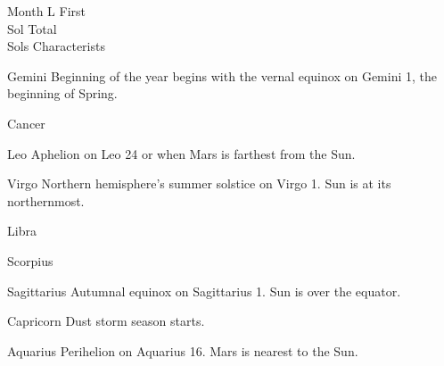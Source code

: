 \vfill
{}
{
    \bTABLE[split=repeat,option=stretch]
    \setupTABLE[column][5]
        [width=.45\textwidth,
        align=yes]
    \setupTABLE[row][each][align=center]
    \setupTABLE[5][1][align=center]

\bTABLEhead
    \bTR[bottomframe=on]
      \bTH  Month \eTH
      \bTH  L \eTH
      \bTH  First\\Sol \eTH
      \bTH  Total\\Sols \eTH
      \bTH  Characterists \eTH
    \eTR
\eTABLEhead

\bTABLEbody
    \bTR
      \bTC Gemini \eTC
      \bTC \math{[0^{\circ}, 30^{\circ})}\eTC
       \eTC
       \eTC
      \bTC Beginning of the year begins with the vernal equinox on Gemini 1, the beginning of Spring.\eTC
    \eTR
    
    \bTR
      \bTC Cancer \eTC
      \bTC \math{[30^{\circ}, 60^{\circ})} \eTC
       \eTC
       \eTC
      \bTC  \eTC
    \eTR
    
    \bTR
      \bTC Leo \eTC
      \bTC \math{[60^{\circ}, 90^{\circ})} \eTC
       \eTC
       \eTC
      \bTC Aphelion on Leo 24 or when Mars is farthest from the Sun.\eTC
    \eTR
    
    \bTR
      \bTC Virgo \eTC
      \bTC \math{[90^{\circ}, 120^{\circ})} \eTC
       \eTC
       \eTC
      \bTC Northern hemisphere's summer solstice on Virgo 1. Sun is at its northernmost.\eTC
    \eTR
    
    \bTR
      \bTC Libra \eTC
      \bTC \math{[120^{\circ}, 150^{\circ})} \eTC
       \eTC
       \eTC
      \bTC  \eTC
    \eTR
    
    \bTR
      \bTC Scorpius \eTC
      \bTC \math{[150^{\circ}, 180^{\circ})} \eTC
       \eTC
       \eTC
      \bTC  \eTC
    \eTR
    
    \bTR
      \bTC Sagittarius \eTC
      \bTC \math{[180^{\circ}, 210^{\circ})} \eTC
       \eTC
       \eTC
      \bTC Autumnal equinox on Sagittarius 1. Sun is over the equator.\eTC
    \eTR
    
    \bTR
      \bTC Capricorn \eTC
      \bTC \math{[210^{\circ}, 240^{\circ})} \eTC
       \eTC
       \eTC
      \bTC Dust storm season starts. \eTC
    \eTR
    
    \bTR
      \bTC Aquarius \eTC
      \bTC \math{[240^{\circ}, 270^{\circ})} \eTC
       \eTC
       \eTC
      \bTC Perihelion on Aquarius 16. Mars is nearest to the Sun.\eTC
    \eTR
    
}
